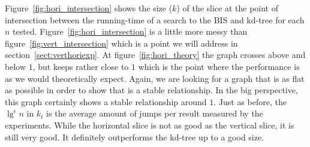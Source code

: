 Figure~\ref{fig:hori_intersection} shows the size ($k$) of the slice at the point of intersection between the running-time of a search to the BIS and kd-tree for each $n$ tested. Figure~\ref{fig:hori_intersection} is a little more messy than figure~\ref{fig:vert_intersection} which is a point we will address in section~\ref{sect:verthoriexp}. At figure~\ref{fig:hori_theory} the graph crosses above and below $1$, but keeps rather close to $1$ which is the point where the performance is as we would theoretically expect. Again, we are looking for a graph that is as flat as possible in order to show that is a stable relationship. In the big perspective, this graph certainly shows a stable relationship around $1$. Just as before, the $\lg^\epsilon n$ in $k_t$ is the average amount of jumps per result measured by the experiments. While the horizontal slice is not as good as the vertical slice, it is still very good. It definitely outperforms the kd-tree up to a good size.

